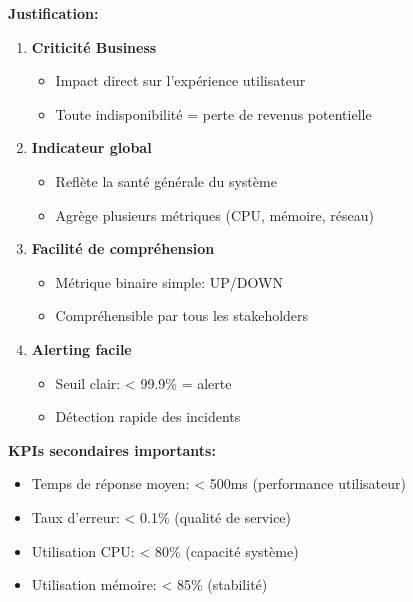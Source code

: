 \documentclass[12pt,a4paper]{article}
\begin{document}
\begin{tcolorbox}[colback=orange!5!white,colframe=orange!75!black,title=KPI Principale: Application Uptime (Disponibilité)]
    \textbf{Justification:}
    \begin{enumerate}
        \item \textbf{Criticité Business}
        \begin{itemize}
            \item Impact direct sur l'expérience utilisateur
            \item Toute indisponibilité = perte de revenus potentielle
        \end{itemize}
        
        \item \textbf{Indicateur global}
        \begin{itemize}
            \item Reflète la santé générale du système
            \item Agrège plusieurs métriques (CPU, mémoire, réseau)
        \end{itemize}
        
        \item \textbf{Facilité de compréhension}
        \begin{itemize}
            \item Métrique binaire simple: UP/DOWN
            \item Compréhensible par tous les stakeholders
        \end{itemize}
        
        \item \textbf{Alerting facile}
        \begin{itemize}
            \item Seuil clair: < 99.9\% = alerte
            \item Détection rapide des incidents
        \end{itemize}
    \end{enumerate}
\end{tcolorbox}

\textbf{KPIs secondaires importants:}
\begin{itemize}
    \item Temps de réponse moyen: < 500ms (performance utilisateur)
    \item Taux d'erreur: < 0.1\% (qualité de service)
    \item Utilisation CPU: < 80\% (capacité système)
    \item Utilisation mémoire: < 85\% (stabilité)
\end{itemize}
\end{document}
